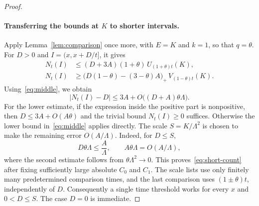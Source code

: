 \documentclass[10pt,a4paper]{amsart}
\begin{document}
\begin{proof}
\paragraph{Transferring the bounds at $K$ to shorter intervals.}
Apply Lemma~\ref{lem:comparison} once more, with $E=K$ and $k=1$, so that
$q=\theta$. For $D>0$ and $I=(x,x+D/t]$, it gives
\begin{align*}
  N_t(I)&\leq
    (D+3A)(1+\theta)\,U_{(1+\theta)t}(K),\\
  N_t(I)&\geq
    \bigl(D(1-\theta)-(3-\theta)A\bigr)_+\,
    V_{(1-\theta)t}(K).
\end{align*}
Using~\eqref{eq:middle}, we obtain
\begin{equation}\label{eq:additive-error}
  |N_t(I)-D|
  \leq3A+O\bigl((D+A)\theta\Lambda\bigr).
\end{equation}
For the lower estimate, if the expression inside the positive part is
nonpositive, then $D\leq3A+O(A\theta)$ and the trivial bound $N_t(I)\geq0$
suffices. Otherwise the lower bound in~\eqref{eq:middle} applies directly.
The scale $S=K/\Lambda^2$ is chosen to make the remaining error
$O(A/\Lambda)$. Indeed, for $D\leq S$,
\[
  D\theta\Lambda\leq\frac A\Lambda,
  \qquad
  A\theta\Lambda=O(A/\Lambda),
\]
where the second estimate follows from $\theta\Lambda^2\to0$.
This proves~\eqref{eq:short-count} after fixing sufficiently large absolute
$C_0$ and $C_1$.
The scale lists use only finitely many predetermined comparison times,
and the last comparison uses $(1\pm\theta)t$, independently of $D$.
Consequently a single time threshold works for every $x$ and
$0<D\leq S$. The case $D=0$ is immediate.
\end{proof}
\end{document}
